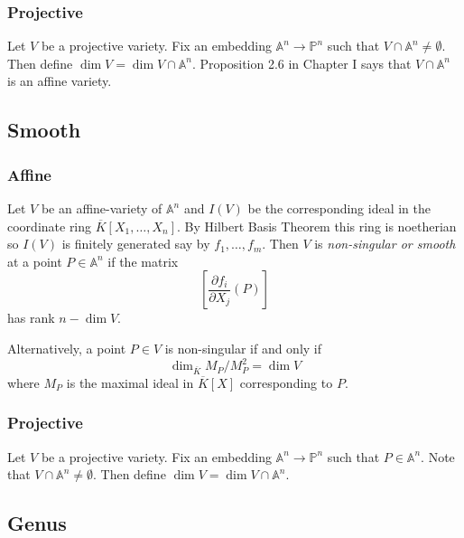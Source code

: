 \documentclass[11pt]{article}
\newcommand{\BB}[1]{\mathbb{#1}} %
\newcommand{\PP}{\BB{P}}
\renewcommand{\AA}{\BB{A}} %
\theoremstyle{plain}%
\theoremstyle{definition}
\theoremstyle{remark}
\begin{document}
\subsubsection{Projective}

Let $V$ be a projective variety. Fix an embedding $\AA^n\to\PP^n$ such that $V\cap\AA^n\neq\emptyset$. Then define $\dim V = \dim V\cap\AA^n$. Proposition 2.6 in Chapter I says that $V\cap\AA^n$ is an affine variety.

\subsection{Smooth}

\subsubsection{Affine}

Let $V$ be an affine-variety of $\AA^n$ and $I(V)$ be the corresponding ideal in the coordinate ring $\overline{K}[X_1,\dots,X_n]$. By Hilbert Basis Theorem this ring is noetherian so $I(V)$ is finitely generated say by $f_1,\dots,f_m$. Then $V$ is \emph{non-singular or smooth} at a point $P\in\AA^n$ if the matrix
$$
\left[\frac{\partial f_i}{\partial X_j}(P)\right]
$$
has rank $n - \dim V$.

Alternatively, a point $P\in V$ is non-singular if and only if
$$
\dim_{\overline{K}} M_P/M_P^2 = \dim V
$$
where $M_P$ is the maximal ideal in $\overline{K}[X]$ corresponding to $P$.

\subsubsection{Projective}

Let $V$ be a projective variety. Fix an embedding $\AA^n\to\PP^n$ such that $P\in \AA^n$. Note that $V\cap\AA^n\neq\emptyset$. Then define $\dim V = \dim V\cap\AA^n$.

\subsection{Genus}

%
\end{document}
